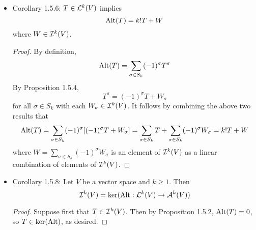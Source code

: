 \documentclass[../notes.tex]{subfiles}
\begin{document}
\begin{itemize}
\begin{proof}
        Now suppose inductively that we have proven the claim for $m-1$. Let $\sigma=\tau\beta$ where $\beta$ is the product of $m-1$ elementary transpositions and $\tau$ is an elementary transposition. Then
        \begin{align*}
            T^\sigma &= (T^\beta)^\tau\tag*{Proposition 1.4.14(3)}\\
            &= (-1)^\tau T^\beta+\cdots\tag*{Base case}\\
            &= (-1)^\tau(-1)^\beta T+\cdots\tag*{Inductive hypothesis}\\
            &= (-1)^\sigma T+\cdots\tag*{Claim 1.4.9}
        \end{align*}
        where the dots are elements of $\ide[k]{V}$.
    \end{proof}
    \item Corollary 1.5.6: $T\in\lin[k]{V}$ implies
    \begin{equation*}
        \Alt(T) = k!T+W
    \end{equation*}
    where $W\in\ide[k]{V}$.
    \begin{proof}
        By definition,
        \begin{equation*}
            \Alt(T) = \sum_{\sigma\in S_k}(-1)^\sigma T^\sigma
        \end{equation*}
        By Proposition 1.5.4,
        \begin{equation*}
            T^\sigma = (-1)^\sigma T+W_\sigma
        \end{equation*}
        for all $\sigma\in S_k$ with each $W_\sigma\in\ide[k]{V}$. It follows by combining the above two results that
        \begin{equation*}
            \Alt(T) = \sum_{\sigma\in S_k}(-1)^\sigma[(-1)^\sigma T+W_\sigma]
            = \sum_{\sigma\in S_k}T+\sum_{\sigma\in S_k}(-1)^\sigma W_\sigma
            = k!T+W
        \end{equation*}
        where $W=\sum_{\sigma\in S_k}(-1)^\sigma W_\sigma$ is an element of $\ide[k]{V}$ as a linear combination of elements of $\ide[k]{V}$.
    \end{proof}
    \item Corollary 1.5.8: Let $V$ be a vector space and $k\geq 1$. Then
    \begin{equation*}
        \ide[k]{V} = \ker(\Alt:\lin[k]{V}\to\alt[k]{V})
    \end{equation*}
    \begin{proof}
        Suppose first that $T\in\ide[k]{V}$. Then by Proposition 1.5.2, $\Alt(T)=0$, so $T\in\ker(\Alt)$, as desired.\par

\end{proof}
\end{itemize}
\end{document}
